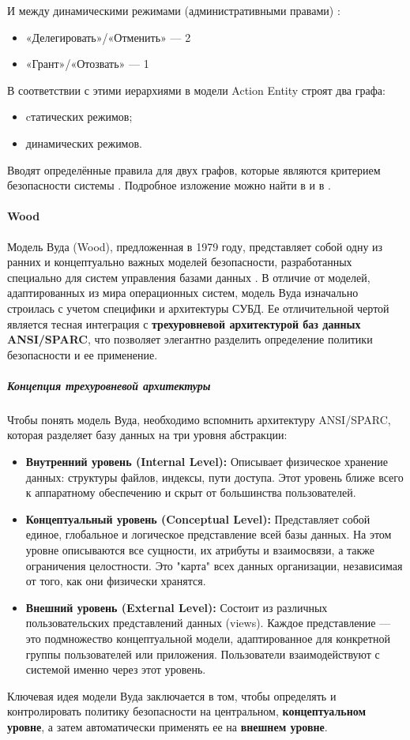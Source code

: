 И между динамическими режимами (административными правами) \autocite{Jalili}:
\begin{itemize}
    \item «Делегировать»/«Отменить» --- 2
    \item «Грант»/«Отозвать» --- 1
\end{itemize}

В соответствии с этими иерархиями в модели Action Entity строят два графа:
\begin{itemize}
    \item cтатических режимов;
    \item динамических режимов.
\end{itemize}

Вводят определённые правила для двух графов, которые являются критерием безопасности системы \autocite{SecModels}.
Подробное изложение можно найти в \autocite{SecModels} и в \autocite{Jalili}.

\paragraph{Wood}



Модель Вуда (Wood), предложенная в 1979 году, представляет собой одну из ранних и концептуально важных моделей безопасности, разработанных специально для систем управления базами данных \autocite{Jalili}. В отличие от моделей, адаптированных из мира операционных систем, модель Вуда изначально строилась с учетом специфики и архитектуры СУБД. Ее отличительной чертой является тесная интеграция с \textbf{трехуровневой архитектурой баз данных ANSI/SPARC}, что позволяет элегантно разделить определение политики безопасности и ее применение.

\subparagraph{Концепция трехуровневой архитектуры}
Чтобы понять модель Вуда, необходимо вспомнить архитектуру ANSI/SPARC, которая разделяет базу данных на три уровня абстракции:

\begin{itemize}
	\item \textbf{Внутренний уровень (Internal Level):} Описывает физическое хранение данных: структуры файлов, индексы, пути доступа. Этот уровень ближе всего к аппаратному обеспечению и скрыт от большинства пользователей.
	\item \textbf{Концептуальный уровень (Conceptual Level):} Представляет собой единое, глобальное и логическое представление всей базы данных. На этом уровне описываются все сущности, их атрибуты и взаимосвязи, а также ограничения целостности. Это "карта" всех данных организации, независимая от того, как они физически хранятся.
	\item \textbf{Внешний уровень (External Level):} Состоит из различных пользовательских представлений данных (views). Каждое представление — это подмножество концептуальной модели, адаптированное для конкретной группы пользователей или приложения. Пользователи взаимодействуют с системой именно через этот уровень.
\end{itemize}
Ключевая идея модели Вуда заключается в том, чтобы определять и контролировать политику безопасности на центральном, \textbf{концептуальном уровне}, а затем автоматически применять ее на \textbf{внешнем уровне}.

